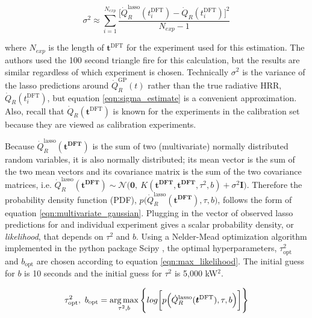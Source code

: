 \documentclass{article}
\begin{document}
 \begin{equation}
  \label{eqn:sigma_estimate}
    \sigma^2 \approx \sum_{i=1}^{N_{exp}}\frac{\Big[\dot{Q}_{R}^{\text{lasso}}(t^{\text{DFT}}_i) - \dot{Q}_{R}(t_i^{\text{DFT}})\Big]^2}{N_{exp}-1} 
\end{equation}

\noindent where $N_{exp}$ is the length of $\boldsymbol{t}^{\text{DFT}}$ for the experiment used for this estimation. The authors used the 100 second triangle fire for this calculation, but the results are similar regardless of which experiment is chosen. Technically $\sigma^2$ is the variance of the lasso predictions around $\dot{Q}_{R}^{\text{GP}}(t)$ rather than the true radiative HRR, $\dot{Q}_{R}(t_i^{\text{DFT}})$, but equation \ref{eqn:sigma_estimate} is a convenient approximation. Also, recall that $\dot{Q}_{R}(\boldsymbol{t}^{\text{DFT}})$ is known for the experiments in the calibration set because they are viewed as calibration experiments.


 Because $\dot{Q}_{R}^{\text{lasso}}(\boldsymbol{t^{\text{DFT}}})$ is the sum of two (multivariate) normally distributed random variables, it is also normally distributed; its mean vector is the sum of the two mean vectors and its covariance matrix is the sum of the two covariance matrices, i.e. $\dot{Q}_{R}^{\text{lasso}}(\boldsymbol{t^{\text{DFT}}}) \sim \mathcal{N}\Big(\boldsymbol{0}, \ K( \boldsymbol{t^{\text{DFT}}}, \boldsymbol{t^{\text{DFT}}}, \tau^2, b) + \sigma^2\boldsymbol{I} \Big)$. Therefore the probability density function (PDF), $p\Big(\dot{Q}_{R}^{\text{lasso}}(\boldsymbol{t^{\text{DFT}}}), \tau, b \Big)$, follows the form of equation \ref{eqn:multivariate_gaussian}. Plugging in the vector of observed lasso predictions for and individual experiment gives a scalar probability density, or \textit{likelihood}, that depends on $\tau^2$ and $b$. Using a Nelder-Mead optimization algorithm \cite{nelder1965simplex} implemented in the python package Scipy \cite{jones2001scipy}, the optimal hyperparameters, $\tau^2_{\text{opt}}$ and $b_{\text{opt}}$ are chosen according to equation \ref{eqn:max_likelihood}. The initial guess for $b$ is 10 seconds and the initial guess for $\tau^2$ is 5,000 kW$^2$. 

\begin{equation}
  \label{eqn:max_likelihood}
  \tau^2_{\text{opt}}, \ b_{\text{opt}} = 
  \operatorname*{arg\,max}_{\tau^2, b} \Bigg\{log\bigg[ p\Big(\dot{Q}_{R}^{\text{lasso}}(\boldsymbol{t^{\text{DFT}}}), \tau, b \Big)\bigg] \Bigg\}
\end{equation}
\end{document}
